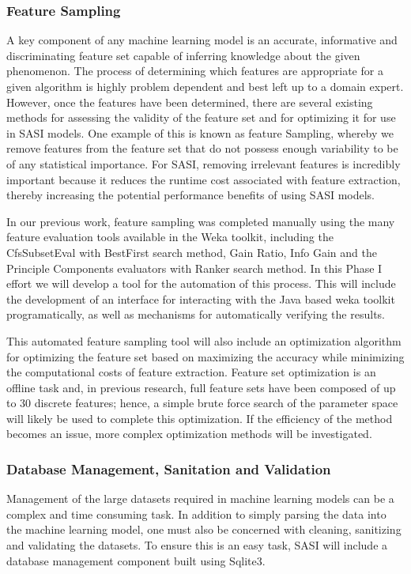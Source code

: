 \subsubsection{Feature Sampling} A key component of any machine learning model is an accurate, informative and discriminating feature set capable of inferring knowledge about the given phenomenon. The process of determining which features are appropriate for a given algorithm is highly problem dependent and best left up to a domain expert. However, once the features have been determined, there are several existing methods for assessing the validity of the feature set and for optimizing it for use in SASI models. One example of this is known as feature Sampling, whereby we remove features from the feature set that do not possess enough variability to be of any statistical importance. For SASI, removing irrelevant features is incredibly important because it reduces the runtime cost associated with feature extraction, thereby increasing the potential performance benefits of using SASI models. 

In our previous work, feature sampling was completed manually using the many feature evaluation tools available in the Weka toolkit, including the CfsSubsetEval with BestFirst search method, Gain Ratio, Info Gain and the Principle Components evaluators with Ranker search method. In this Phase I effort we will develop a tool for the automation of this process. This will include the development of an interface for interacting with the Java based weka toolkit programatically, as well as mechanisms for automatically verifying the results. 

This automated feature sampling tool will also include an optimization algorithm for optimizing the feature set based on maximizing the accuracy while minimizing the computational costs of feature extraction. Feature set optimization is an offline task and, in previous research, full feature sets have been composed of up to 30 discrete features; hence, a simple brute force search of the parameter space will likely be used to complete this optimization. If the efficiency of the method becomes an issue, more complex optimization methods will be investigated. 
  
\subsubsection{Database Management, Sanitation and Validation} Management of the large datasets required in machine learning models can be a complex and time consuming task. In addition to simply parsing the data into the machine learning model, one must also be concerned with cleaning, sanitizing and validating the datasets. To ensure this is an easy task, SASI will include a database management component built using Sqlite3. 

